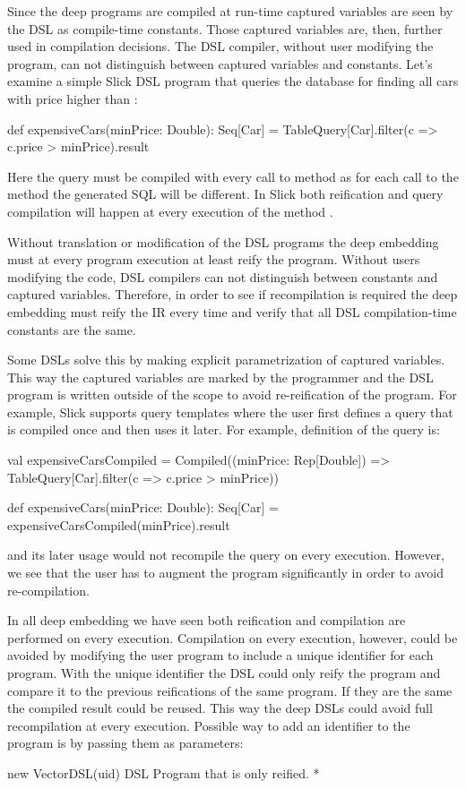 Since the deep programs are compiled at run-time captured variables are seen by the DSL
  as compile-time constants. Those captured variables are, then, further used in compilation
  decisions. The DSL compiler, without user modifying the program, can not distinguish between
  captured variables and constants.  Let's examine a simple Slick DSL program that queries the database
  for finding all cars with price higher than :\begin{lstparagraph}
def expensiveCars(minPrice: Double): Seq[Car] =
  TableQuery[Car].filter(c => c.price > minPrice).result
\end{lstparagraph}
Here the query must be compiled with every call to  method as for
each call to the method the generated SQL will be different. In Slick both reification
and query compilation will happen at every execution of the method .


Without translation or modification of the DSL programs the deep embedding must
 at every program execution at least reify the program.
 Without users modifying the code, DSL compilers can not distinguish between
 constants and captured variables. Therefore, in order to see if recompilation is required
 the deep embedding must reify the IR every time and verify that all DSL compilation-time
 constants are the same.

Some DSLs solve this by making explicit parametrization of captured variables. This way the captured
 variables are marked by the programmer and the DSL program is written outside of the scope to avoid
 re-reification of the program. For example, Slick supports query templates where the user first
 defines a query that is compiled once and then uses it later. For example, definition of the  query is:\begin{lstparagraph}
val expensiveCarsCompiled = Compiled((minPrice: Rep[Double]) =>
  TableQuery[Car].filter(c => c.price > minPrice))

def expensiveCars(minPrice: Double): Seq[Car] =
  expensiveCarsCompiled(minPrice).result
 \end{lstparagraph}
 and its later usage would not recompile the query on every execution. However, we see that
 the user has to augment the program significantly in order to avoid re-compilation.

In all deep embedding we have seen both reification and compilation are performed on every
 execution. Compilation on every execution, however, could be avoided by modifying the user program to include
 a unique identifier for each program. With the unique identifier the DSL could only reify
 the program and compare it to the previous reifications of the same program. If they are the same
 the compiled result could be reused. This way the deep DSLs could avoid full recompilation
 at every execution. Possible way to add an identifier to the program is by passing them as parameters:\begin{lstparagraph}
 new VectorDSL(uid) { \* DSL Program that is only reified. *\ }
 \end{lstparagraph}

